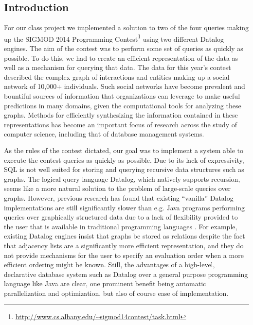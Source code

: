 \documentclass{article}
\begin{document}
\begin{multicols}{2}

\section{Introduction}

For our class project we implemented a solution to two of the four queries making up the SIGMOD 2014 Programming Contest\footnote{\protect\url{http://www.cs.albany.edu/~sigmod14contest/task.html}} using two different Datalog engines. The aim of the contest was to perform some set of queries as quickly as possible. To do this, we had to create an efficient representation of the data as well as a mechanism for querying that data. The data for this year’s contest described the complex graph of interactions and entities making up a social network of 10,000+ individuals. Such social networks have become prevalent and bountiful sources of information that organizations can leverage to make useful predictions in many domains, given the computational tools for analyzing these graphs. Methods for efficiently synthesizing the information contained in these representations has become an important focus of research across the study of computer science, including that of database management systems.

As the rules of the contest dictated, our goal was to implement a system able to execute the contest queries as quickly as possible. Due to its lack of expressivity, SQL is not well suited for storing and querying recursive data structures such as graphs. The logical query language Datalog, which natively supports recursion, seems like a more natural solution to the problem of large-scale queries over graphs. However, previous research has found that existing ``vanilla'' Datalog implementations are still significantly slower than e.g. Java programs performing queries over graphically structured data due to a lack of flexibility provided to the user that is available in traditional programming languages \cite{seo-et-al-13a}. For example, existing Datalog engines insist that graphs be stored as relations despite the fact that adjacency lists are a significantly more efficient representation, and they do not provide mechanisms for the user to specify an evaluation order when a more efficient ordering might be known. Still, the advantages of a high-level, declarative database system such as Datalog over a general purpose programming language like Java are clear, one prominent benefit being automatic parallelization and optimization, but also of course ease of implementation. 


\end{multicols}
\end{document}
